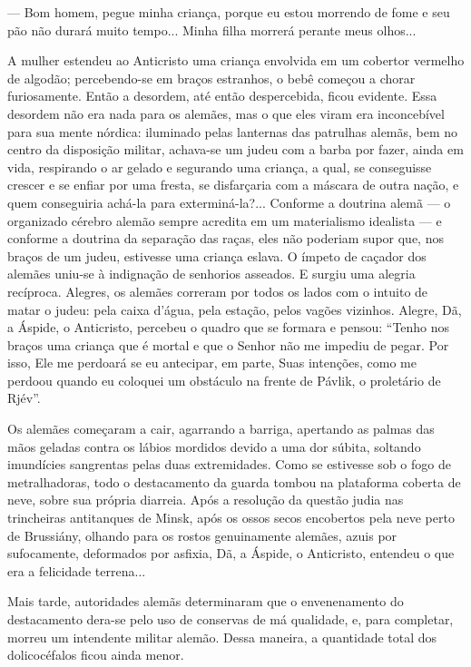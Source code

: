 --- Bom homem, pegue minha criança, porque eu estou morrendo de fome e
seu pão não durará muito tempo... Minha filha morrerá perante meus
olhos...

A mulher estendeu ao Anticristo uma criança envolvida em um cobertor
vermelho de algodão; percebendo-se em braços estranhos, o bebê começou a
chorar furiosamente. Então a desordem, até então despercebida, ficou
evidente. Essa desordem não era nada para os alemães, mas o que eles
viram era inconcebível para sua mente nórdica: iluminado pelas lanternas
das patrulhas alemãs, bem no centro da disposição militar, achava-se um
judeu com a barba por fazer, ainda em vida, respirando o ar gelado e
segurando uma criança, a qual, se conseguisse crescer e se enfiar por
uma fresta, se disfarçaria com a máscara de outra nação, e quem
conseguiria achá-la para exterminá-la?... Conforme a doutrina alemã ---
o organizado cérebro alemão sempre acredita em um materialismo idealista
--- e conforme a doutrina da separação das raças, eles não poderiam
supor que, nos braços de um judeu, estivesse uma criança eslava. O
ímpeto de caçador dos alemães uniu-se à indignação de senhorios
asseados. E surgiu uma alegria recíproca. Alegres, os alemães correram
por todos os lados com o intuito de matar o judeu: pela caixa d'água,
pela estação, pelos vagões vizinhos. Alegre, Dã, a Áspide, o Anticristo,
percebeu o quadro que se formara e pensou: ``Tenho nos braços uma
criança que é mortal e que o Senhor não me impediu de pegar. Por isso,
Ele me perdoará se eu antecipar, em parte, Suas intenções, como me
perdoou quando eu coloquei um obstáculo na frente de Pávlik, o
proletário de Rjév''.

Os alemães começaram a cair, agarrando a barriga, apertando as palmas
das mãos geladas contra os lábios mordidos devido a uma dor súbita,
soltando imundícies sangrentas pelas duas extremidades. Como se
estivesse sob o fogo de metralhadoras, todo o destacamento da guarda
tombou na plataforma coberta de neve, sobre sua própria diarreia. Após a
resolução da questão judia nas trincheiras antitanques de Minsk, após os
ossos secos encobertos pela neve perto de Brussiány, olhando para os
rostos genuinamente alemães, azuis por sufocamente, deformados por
asfixia, Dã, a Áspide, o Anticristo, entendeu o que era a felicidade
terrena...

Mais tarde, autoridades alemãs determinaram que o envenenamento do
destacamento dera-se pelo uso de conservas de má qualidade, e, para
completar, morreu um intendente militar alemão. Dessa maneira, a
quantidade total dos dolicocéfalos ficou ainda menor.

